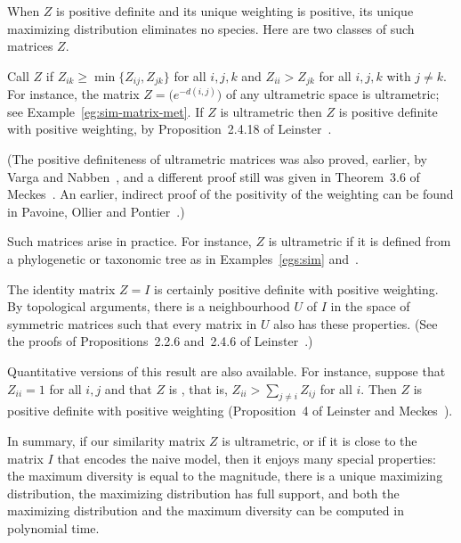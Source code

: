 When $Z$ is positive definite and its unique weighting is positive,
its unique maximizing distribution eliminates no species.  Here are two
classes of such matrices $Z$.

\begin{example}
% 
Call $Z$  if $Z_{ik} \geq
\min\{Z_{ij}, Z_{jk}\}$ for all $i, j, k$ and $Z_{ii} > Z_{jk}$ for all $i,
j, k$ with $j \neq k$.  For instance, the matrix $Z = \bigl(e^{-d(i,
  j)}\bigr)$ of any ultrametric space is ultrametric; see
Example~\ref{eg:sim-matrix-met}.  If $Z$ is ultrametric then $Z$ is
positive definite with positive weighting, by Proposition~2.4.18 of
Leinster~\cite{MMS}.

(The positive definiteness of ultrametric matrices was also proved,
earlier, by Varga and Nabben~\cite{VaNa}, and a different proof still was
given in Theorem~3.6 of Meckes~\cite{MeckPDM}.  An earlier, indirect proof
of the positivity of the weighting can be found in Pavoine, Ollier and
Pontier~\cite{POP}.)

Such matrices arise in practice.  For instance, $Z$ is ultrametric if it is
defined from a phylogenetic or taxonomic tree as in
Examples~\ref{egs:sim} and~.  
\end{example}

\begin{example}
The identity matrix $Z = I$ is certainly positive definite with positive
weighting.  By topological arguments, there is a neighbourhood $U$ of $I$
in the space of symmetric matrices such that every matrix in $U$ also has
these properties.  (See the proofs of Propositions~2.2.6 and~2.4.6 of
Leinster~\cite{MMS}.)  

Quantitative versions of this result are also available.  For instance,
suppose that $Z_{ii} = 1$ for all $i, j$ and that $Z$ is ,%
% 
%
% 
that is, $Z_{ii} > \sum_{j \neq i} Z_{ij}$ for all $i$.  Then $Z$ is
positive definite with positive weighting (Proposition~4 of Leinster and
Meckes~\cite{MDBB}).
\end{example}

In summary, if our similarity matrix $Z$ is ultrametric, or if it is close
to the matrix $I$ that encodes the naive model, then it enjoys many special
properties: the maximum diversity is equal to the magnitude, there is a
unique maximizing distribution, the maximizing distribution has full
support, and both the maximizing distribution and the maximum diversity can
be computed in polynomial time.

